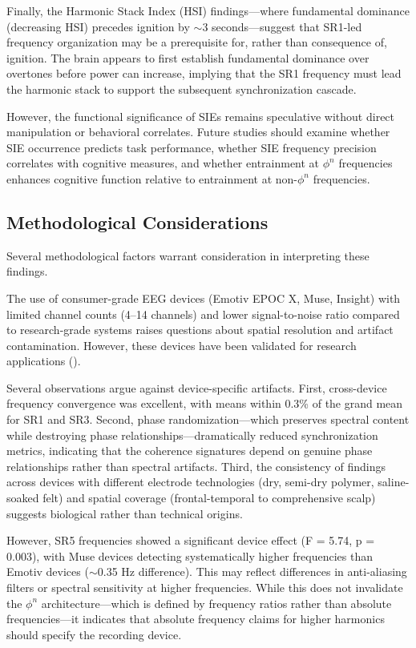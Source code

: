 \documentclass[11pt,a4paper]{article}
\begin{document}
Finally, the Harmonic Stack Index (HSI) findings—where fundamental dominance (decreasing HSI) precedes ignition by $\sim$3 seconds—suggest that SR1-led frequency organization may be a prerequisite for, rather than consequence of, ignition. The brain appears to first establish fundamental dominance over overtones before power can increase, implying that the SR1 frequency must lead the harmonic stack to support the subsequent synchronization cascade.

However, the functional significance of SIEs remains speculative without direct manipulation or behavioral correlates. Future studies should examine whether SIE occurrence predicts task performance, whether SIE frequency precision correlates with cognitive measures, and whether entrainment at $\phi^n$ frequencies enhances cognitive function relative to entrainment at non-$\phi^n$ frequencies.

\subsection{Methodological Considerations}

Several methodological factors warrant consideration in interpreting these findings.

The use of consumer-grade EEG devices (Emotiv EPOC X, Muse, Insight) with limited channel counts (4–14 channels) and lower signal-to-noise ratio compared to research-grade systems raises questions about spatial resolution and artifact contamination. However, these devices have been validated for research applications (\cite{badcock2015validation, krigolson2017choosing}).

Several observations argue against device-specific artifacts. First, cross-device frequency convergence was excellent, with means within 0.3\% of the grand mean for SR1 and SR3. Second, phase randomization—which preserves spectral content while destroying phase relationships—dramatically reduced synchronization metrics, indicating that the coherence signatures depend on genuine phase relationships rather than spectral artifacts. Third, the consistency of findings across devices with different electrode technologies (dry, semi-dry polymer, saline-soaked felt) and spatial coverage (frontal-temporal to comprehensive scalp) suggests biological rather than technical origins.

However, SR5 frequencies showed a significant device effect (F = 5.74, p = 0.003), with Muse devices detecting systematically higher frequencies than Emotiv devices ($\sim$0.35 Hz difference). This may reflect differences in anti-aliasing filters or spectral sensitivity at higher frequencies. While this does not invalidate the $\phi^n$ architecture—which is defined by frequency ratios rather than absolute frequencies—it indicates that absolute frequency claims for higher harmonics should specify the recording device.
\end{document}
